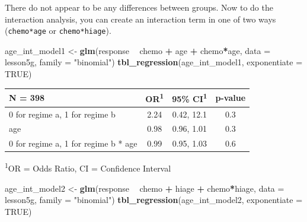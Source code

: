 \documentclass[]{book}
\newenvironment{Shaded}{\begin{snugshade}}{\end{snugshade}}
\newcommand{\DataTypeTok}[1]{\textcolor[rgb]{0.13,0.29,0.53}{#1}}
\newcommand{\KeywordTok}[1]{\textcolor[rgb]{0.13,0.29,0.53}{\textbf{#1}}}
\newcommand{\NormalTok}[1]{#1}
\newcommand{\OperatorTok}[1]{\textcolor[rgb]{0.81,0.36,0.00}{\textbf{#1}}}
\newcommand{\OtherTok}[1]{\textcolor[rgb]{0.56,0.35,0.01}{#1}}
\newcommand{\StringTok}[1]{\textcolor[rgb]{0.31,0.60,0.02}{#1}}
\begin{document}
There do not appear to be any differences between groups. Now to do the interaction analysis, you can create an interaction term in one of two ways (\texttt{chemo*age} or \texttt{chemo*hiage}).

\begin{Shaded}
\begin{Highlighting}[]
\NormalTok{age_int_model1 <-}
\StringTok{  }\KeywordTok{glm}\NormalTok{(response }\OperatorTok{~}\StringTok{ }\NormalTok{chemo }\OperatorTok{+}\StringTok{ }\NormalTok{age }\OperatorTok{+}\StringTok{ }\NormalTok{chemo}\OperatorTok{*}\NormalTok{age,}
      \DataTypeTok{data =}\NormalTok{ lesson5g,}
      \DataTypeTok{family =} \StringTok{"binomial"}\NormalTok{)}
\KeywordTok{tbl_regression}\NormalTok{(age_int_model1, }\DataTypeTok{exponentiate =} \OtherTok{TRUE}\NormalTok{)}
\end{Highlighting}
\end{Shaded}

\captionsetup[table]{labelformat=empty,skip=1pt}
\begin{longtable}{lccc}
\toprule
\textbf{N = 398} & \textbf{OR}\textsuperscript{1} & \textbf{95\% CI}\textsuperscript{1} & \textbf{p-value} \\ 
\midrule
0 for regime a, 1 for regime b & 2.24 & 0.42, 12.1 & 0.3 \\ 
age & 0.98 & 0.96, 1.01 & 0.3 \\ 
0 for regime a, 1 for regime b * age & 0.99 & 0.95, 1.03 & 0.6 \\ 
\bottomrule
\end{longtable}
\vspace{-5mm}
\begin{minipage}{\linewidth}
\textsuperscript{1}OR = Odds Ratio, CI = Confidence Interval \\ 
\end{minipage}

\begin{Shaded}
\begin{Highlighting}[]
\NormalTok{age_int_model2 <-}
\StringTok{  }\KeywordTok{glm}\NormalTok{(response }\OperatorTok{~}\StringTok{ }\NormalTok{chemo }\OperatorTok{+}\StringTok{ }\NormalTok{hiage }\OperatorTok{+}\StringTok{ }\NormalTok{chemo}\OperatorTok{*}\NormalTok{hiage,}
      \DataTypeTok{data =}\NormalTok{ lesson5g,}
      \DataTypeTok{family =} \StringTok{"binomial"}\NormalTok{)}
\KeywordTok{tbl_regression}\NormalTok{(age_int_model2, }\DataTypeTok{exponentiate =} \OtherTok{TRUE}\NormalTok{)}
\end{Highlighting}
\end{Shaded}
\end{document}
